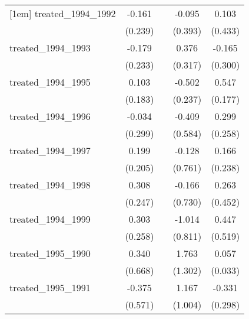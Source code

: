 {\begin{tabular}{l*{4}{c}}
[1em]
treated\_1994\_1992&      -0.161         &                     &      -0.095         &       0.103         \\
            &     (0.239)         &                     &     (0.393)         &     (0.433)         \\
[1em]
treated\_1994\_1993&      -0.179         &                     &       0.376         &      -0.165         \\
            &     (0.233)         &                     &     (0.317)         &     (0.300)         \\
[1em]
treated\_1994\_1995&       0.103         &                     &      -0.502\sym{*}  &       0.547\sym{**} \\
            &     (0.183)         &                     &     (0.237)         &     (0.177)         \\
[1em]
treated\_1994\_1996&      -0.034         &                     &      -0.409         &       0.299         \\
            &     (0.299)         &                     &     (0.584)         &     (0.258)         \\
[1em]
treated\_1994\_1997&       0.199         &                     &      -0.128         &       0.166         \\
            &     (0.205)         &                     &     (0.761)         &     (0.238)         \\
[1em]
treated\_1994\_1998&       0.308         &                     &      -0.166         &       0.263         \\
            &     (0.247)         &                     &     (0.730)         &     (0.452)         \\
[1em]
treated\_1994\_1999&       0.303         &                     &      -1.014         &       0.447         \\
            &     (0.258)         &                     &     (0.811)         &     (0.519)         \\
[1em]
treated\_1995\_1990&       0.340         &                     &       1.763         &       0.057         \\
            &     (0.668)         &                     &     (1.302)         &     (0.033)         \\
[1em]
treated\_1995\_1991&      -0.375         &                     &       1.167         &      -0.331         \\
            &     (0.571)         &                     &     (1.004)         &     (0.298)         \\

\end{tabular}}
